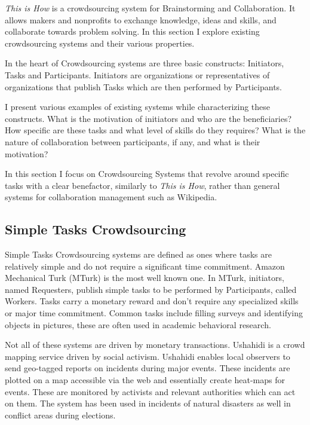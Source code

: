\textit{This is How} is a crowdsourcing system for Brainstorming and Collaboration. It allows makers and nonprofits to exchange knowledge, ideas and skills, and collaborate towards problem solving. In this section I explore existing crowdsourcing systems and their various properties.

In the heart of Crowdsourcing systems are three basic constructs: Initiators, Tasks and Participants. Initiators are organizations or representatives of organizations that publish Tasks which are then performed by Participants. 

I present various examples of existing systems while characterizing these constructs. What is the motivation of initiators and who are the beneficiaries? How specific are these tasks and what level of skills do they requires? What is the nature of collaboration between participants, if any, and what is their motivation?

In this section I focus on Crowdsourcing Systems that revolve around specific tasks with a clear benefactor, similarly to \textit{This is How}, rather than general systems for collaboration management such as Wikipedia.

\subsection{Simple Tasks Crowdsourcing}

Simple Tasks Crowdsourcing systems are defined as ones where tasks are relatively simple and do not require a significant time commitment. Amazon Mechanical Turk (MTurk) \cite{mturk} is the most well known one. In MTurk, initiators, named Requesters, publish simple tasks to be performed by Participants, called Workers. Tasks carry a monetary reward and don't require any specialized skills or major time commitment. Common tasks include filling surveys and  identifying objects in pictures, these are often used in academic behavioral research.  

Not all of these systems are driven by monetary transactions. Ushahidi is a crowd mapping service driven by social activism\cite{ushahidi}. Ushahidi enables local observers to send geo-tagged reports on incidents during major events. These incidents are plotted on a map accessible via the web and essentially create heat-maps for events. These are monitored by activists and relevant authorities which can act on them. The system has been used in incidents of natural disasters as well in conflict areas during elections. 

